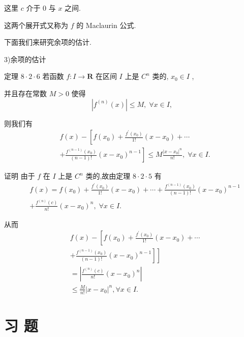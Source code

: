 这里 $c$ 介于 0 与 $x$ 之间.

这两个展开式又称为 $f$ 的 Maclaurin 公式.

下面我们来研究余项的估计.

3)余项的估计

定理 $8 \cdot  2 \cdot  6$ 若函数 $f : I \rightarrow  \mathbf{R}$ 在区间 $I$ 上是 ${C}^{n}$ 类的, ${x}_{0} \in  I$ ,

并且存在常数 $M > 0$ 使得
$$\left| {{f}^{\left( n\right) }\left( x\right) }\right|  \leq  M,\;\forall x \in  I,$$

则我们有
\begin{align*}
	&f\left( x\right)  - \left\lbrack  {f\left( {x}_{0}\right)  + \frac{{f}^{\prime }\left( {x}_{0}\right) }{1!}\left( {x - {x}_{0}}\right)  + \cdots }\right.\\
	&\left. {+\frac{{f}^{\left( n - 1\right) }\left( {x}_{0}\right) }{\left( {n - 1}\right) !}{\left( x - {x}_{0}\right) }^{n - 1}}\right\rbrack   \leq  M\frac{{\left| x - {x}_{0}\right| }^{n}}{n!},\;\forall x \in  I.
\end{align*}

证明 由于 $f$ 在 $I$ 上是 ${C}^{n}$ 类的,故由定理 $8 \cdot  2 \cdot  5$ 有
\begin{align*}
	&f\left( x\right)  = f\left( {x}_{0}\right)  + \frac{{f}^{\prime }\left( {x}_{0}\right) }{1!}\left( {x - {x}_{0}}\right)  + \cdots  + \frac{{f}^{\left( n - 1\right) }\left( {x}_{0}\right) }{\left( {n - 1}\right) !}{\left( x - {x}_{0}\right) }^{n - 1}\\
	&+ \frac{{f}^{\left( n\right) }\left( c\right) }{n!}{\left( x - {x}_{0}\right) }^{n},\;\forall x \in  I.
\end{align*}

从而
\begin{align*}
	&f\left( x\right)  - \left\lbrack  {f\left( {x}_{0}\right)  + \frac{{f}^{\prime }\left( {x}_{0}\right) }{1!}\left( {x - {x}_{0}}\right)  + \cdots }\right.\\
	&\left. \left. {+\frac{{f}^{\left( n - 1\right) }\left( {x}_{0}\right) }{\left( {n - 1}\right) !}{\left( x - {x}_{0}\right) }^{n - 1}}\right\rbrack  \right\rbrack\\
	&= \left| {\frac{{f}^{\left( n\right) }\left( c\right) }{n!}{\left( x - {x}_{0}\right) }^{n}}\right|\\
	&\leq  \frac{M}{n!}{\left| x - {x}_{0}\right| }^{n},\forall x \in  I.
\end{align*}

\section*{习 题}

